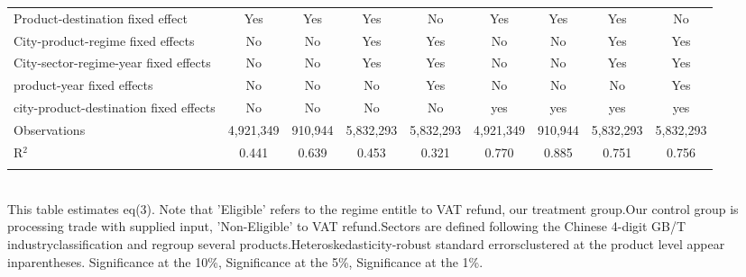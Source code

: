 \documentclass[preview]{standalone}
\begin{document}
\begin{table}[!htbp]
\begin{adjustbox}{width=\textwidth, totalheight=\baselineskip,keepaspectratio}
\begin{tabular}{@{\extracolsep{5pt}}lcccccccc}
Product-destination fixed effect & Yes & Yes & Yes & No & Yes & Yes & Yes & No \\ 
City-product-regime fixed effects & No & No & Yes & Yes & No & No & Yes & Yes \\ 
City-sector-regime-year fixed effects & No & No & Yes & Yes & No & No & Yes & Yes \\ 
product-year fixed effects & No & No & No & Yes & No & No & No & Yes \\ 
city-product-destination fixed effects & No & No & No & No & yes & yes & yes & yes \\ 
Observations & 4,921,349 & 910,944 & 5,832,293 & 5,832,293 & 4,921,349 & 910,944 & 5,832,293 & 5,832,293 \\ 
R$^{2}$ & 0.441 & 0.639 & 0.453 & 0.321 & 0.770 & 0.885 & 0.751 & 0.756 \\ 
\hline 
\hline \\[-1.8ex] 
\end{tabular}
\end{adjustbox}
\begin{tablenotes} 
 \small 
 \item \\ 
This table estimates eq(3). Note that 'Eligible' refers to the regime entitle to VAT refund, our treatment group.Our control group is processing trade with supplied input, 'Non-Eligible' to VAT refund.Sectors are defined following the Chinese 4-digit GB/T industryclassification and regroup several products.Heteroskedasticity-robust standard errorsclustered at the product level appear inparentheses.\sym{*} Significance at the 10\%, \sym{**} Significance at the 5\%, \sym{***} Significance at the 1\%. 
\end{tablenotes}
\end{table}
\end{document}
